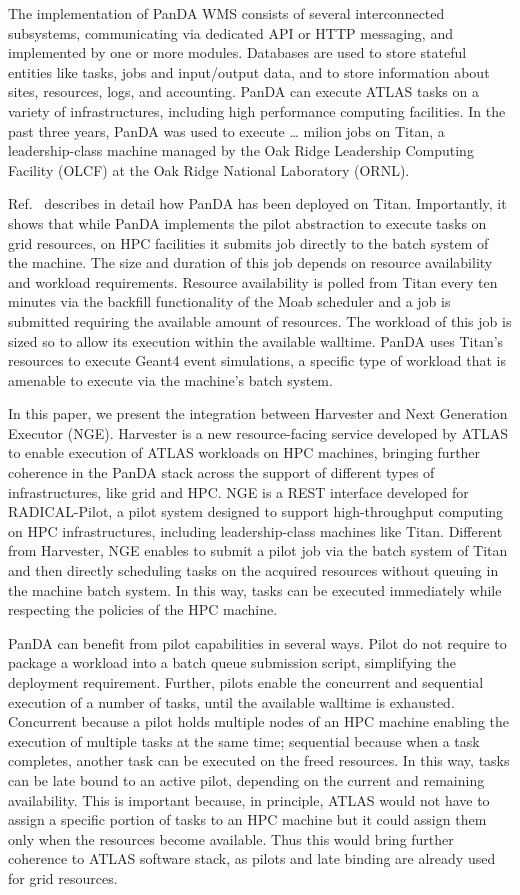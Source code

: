 \documentclass{webofc}
\begin{document}
The implementation of PanDA WMS consists of several interconnected
subsystems, communicating via dedicated API or HTTP messaging, and
implemented by one or more modules. Databases are used to store stateful
entities like tasks, jobs and input/output data, and to store information
about sites, resources, logs, and accounting. PanDA can execute ATLAS tasks
on a variety of infrastructures, including high performance computing
facilities. In the past three years, PanDA was used to execute … milion jobs
on Titan, a leadership-class machine managed by the Oak Ridge Leadership
Computing Facility (OLCF) at the Oak Ridge National Laboratory (ORNL).

Ref.~\cite{Doleynik2017high} describes in detail how PanDA has been deployed
on Titan. Importantly, it shows that while PanDA implements the pilot
abstraction to execute tasks on grid resources, on HPC facilities it submits
job directly to the batch system of the machine. The size and duration of
this job depends on resource availability and workload requirements. Resource
availability is polled from Titan every ten minutes via the backfill
functionality of the Moab scheduler and a job is submitted requiring the
available amount of resources. The workload of this job is sized so to allow
its execution within the available walltime. PanDA uses Titan’s resources to
execute Geant4 event simulations, a specific type of workload that is
amenable to execute via the machine’s batch system.

In this paper, we present the integration between Harvester and Next
Generation Executor (NGE). Harvester is a new resource-facing service
developed by ATLAS to enable execution of ATLAS workloads on HPC machines,
bringing further coherence in the PanDA stack across the support of different
types of infrastructures, like grid and HPC. NGE is a REST interface
developed for RADICAL-Pilot, a pilot system designed to support
high-throughput computing on HPC infrastructures, including leadership-class
machines like Titan. Different from Harvester, NGE enables to submit a pilot
job via the batch system of Titan and then directly scheduling tasks on the
acquired resources without queuing in the machine batch system. In this way,
tasks can be executed immediately while respecting the policies of the HPC
machine.

PanDA can benefit from pilot capabilities in several ways. Pilot do not
require to package a workload into a batch queue submission script,
simplifying the deployment requirement. Further, pilots enable the concurrent
and sequential execution of a number of tasks, until the available walltime
is exhausted. Concurrent because a pilot holds multiple nodes of an HPC
machine enabling the execution of multiple tasks at the same time; sequential
because when a task completes, another task can be executed on the freed
resources. In this way, tasks can be late bound to an active pilot, depending
on the current and remaining availability. This is important because, in
principle, ATLAS would not have to assign a specific portion of tasks to an
HPC machine but it could assign them only when the resources become
available. Thus this would bring further coherence to ATLAS software stack,
as pilots and late binding are already used for grid resources.
\end{document}
